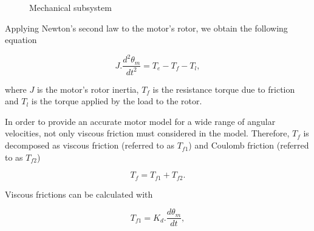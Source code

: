\documentclass{article}
\begin{document}
    \begin{figure}[H]
        \center
        \caption{Mechanical subsystem}
        \label{fig:mechanical_subsys}
    \end{figure}

    Applying Newton's second law to the motor's rotor, we obtain the following equation

    \begin{equation}
        J.\frac{d^2\theta_m}{dt^2}=T_e-T_f-T_l,
        \label{eq:newtons_law_at_shaft}
    \end{equation}

    where $J$ is the motor's rotor inertia, $T_f$ is the resistance torque due to friction and $T_l$ is the torque applied by the load to the rotor.

    In order to provide an accurate motor model for a wide range of angular velocities, not only viscous friction must considered in the model. Therefore, $T_f$ is decomposed as viscous friction (referred to as $T_{f1}$) and Coulomb friction (referred to as $T_{f2}$)

    \begin{equation}
        T_f = T_{f1} + T_{f2}.
    \end{equation}

    Viscous frictions can be calculated with

    \begin{equation}
        T_{f1} = K_d.\frac{d\theta_m}{dt},
    \end{equation}
\end{document}
